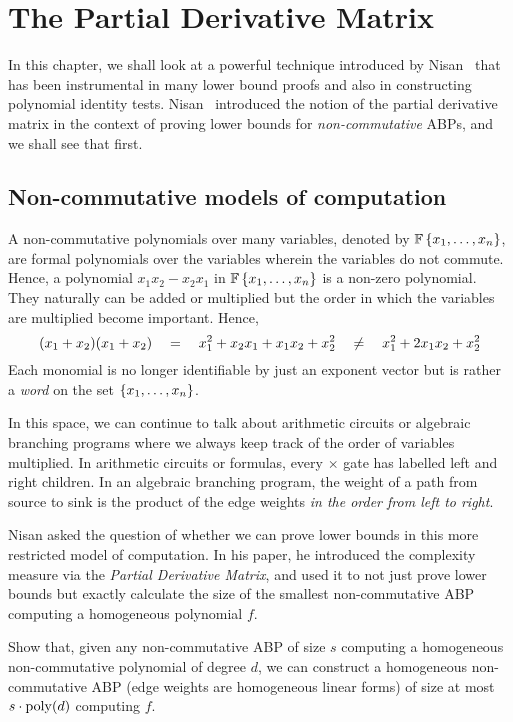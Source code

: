 \chapter{The Partial Derivative Matrix}\label{chap:evalDim}

In this chapter, we shall look at a powerful technique introduced by Nisan~\cite{nis91} that has been instrumental in many lower bound proofs and also in constructing polynomial identity tests.
Nisan~\cite{nis91} introduced the notion of the partial derivative matrix in the context of proving lower bounds for \emph{non-commutative} ABPs, and we shall see that first.

\section{Non-commutative models of computation}

A non-commutative polynomials over many variables, denoted by $\mathbb{F}\left\{x_1,\ldots, x_n\right\}$, are formal polynomials over the variables wherein the variables do not commute.
Hence, a polynomial $x_1x_2 - x_2x_1$ in $\mathbb{F}\left\{x_1,\ldots, x_n\right\}$ is a non-zero polynomial.
They naturally can be added or multiplied but the order in which the variables are multiplied become important.
Hence,
\[
(x_1 + x_2)(x_1 + x_2) \quad = \quad x_1^2 + x_2x_1 + x_1x_2 + x_2^2 \quad \neq \quad x_1^2 + 2x_1x_2 + x_2^2
\]
Each monomial is no longer identifiable by just an exponent vector but is rather a \emph{word} on the set $\left\{x_1,\ldots, x_n\right\}$. 

In this space, we can continue to talk about arithmetic circuits or algebraic branching programs where we always keep track of the order of variables multiplied.
In arithmetic circuits or formulas, every $\times$ gate has labelled left and right children.
In an algebraic branching program, the weight of a path from source to sink is the product of the edge weights \emph{in the order from left to right}.

Nisan \cite{nis91} asked the question of whether we can prove lower bounds in this more restricted model of computation. In his paper, he introduced the complexity measure via the \emph{Partial Derivative Matrix}, and used it to not just prove lower bounds but exactly calculate the size of the smallest non-commutative ABP computing a homogeneous polynomial $f$. \\

\begin{exercise}
Show that, given any non-commutative ABP of size $s$ computing a homogeneous non-commutative polynomial of degree $d$, we can construct a homogeneous non-commutative ABP (edge weights are homogeneous linear forms) of size at most $s \cdot \operatorname{poly}(d)$ computing $f$. 
\end{exercise}

